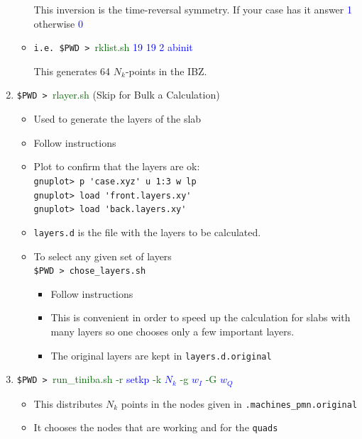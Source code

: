 \documentclass[12pt]{article}
\numberwithin{equation}{section}
\begin{document}
\begin{enumerate}
\begin{itemize}
This inversion is the time-reversal symmetry. If your case has
it answer \textcolor{blue}{1} 
otherwise \textcolor{blue}{0} 

\item{\small \verb=i.e. $PWD > =\textcolor{darkgreen}{rklist.sh}
\textcolor{blue}{ 19 19 2 abinit}

This generates 64 $N_k$-points in the IBZ.
}
\end{itemize}
\item \verb=$PWD > =\textcolor{darkgreen}{rlayer.sh} (Skip for Bulk a Calculation)
\begin{itemize}
\item Used to generate the layers of the slab
\item Follow instructions
\item Plot to confirm that the layers are ok:\\
\verb=gnuplot> p 'case.xyz' u 1:3 w lp=\\
\verb=gnuplot> load 'front.layers.xy'=\\
\verb=gnuplot> load 'back.layers.xy'=
\item \verb=layers.d= is the file with the layers to be calculated.  
\item To select any given set of layers\\ 
\verb=$PWD > chose_layers.sh=
\begin{itemize}
\item Follow instructions
\item This is convenient in order to speed
 up the calculation for slabs with many
 layers so one chooses only a few important layers. 
\item The original layers are kept in \verb=layers.d.original=
\end{itemize}
\end{itemize}
\item
\verb=$PWD > =\textcolor{darkgreen}{run\_tiniba.sh}
 \textcolor{darkgreen}{-r} \textcolor{blue}{setkp} 
 \textcolor{darkgreen}{-k} \textcolor{blue}{$N_k$} 
 \textcolor{darkgreen}{-g} \textcolor{blue}{$w_I$} 
 \textcolor{darkgreen}{-G} \textcolor{blue}{$w_Q$} 
\begin{itemize}
\item This distributes $N_k$ points in the nodes given in
  \verb=.machines_pmn.original=
\item It chooses the nodes that are working and for the \verb=quads=

\end{itemize}
\end{enumerate}
\end{document}
